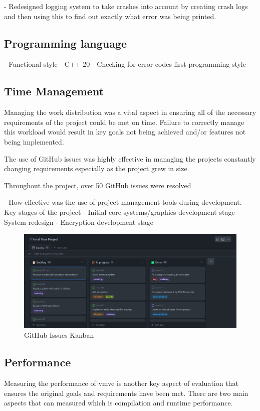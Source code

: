 \documentclass[11pt]{article}
\begin{document}
- Redesigned logging system to take crashes into account by creating crash logs
 and then using this to find out exactly what error was being printed.

\subsection{Programming language}
- Functional style
- C++ 20
- Checking for error codes first programming style

\subsection{Time Management}
Managing the work distribution was a vital aspect in ensuring all of the
necessary requirements of the project could be met on time. Failure to correctly 
manage this workload would result in key goals not being achieved and/or features
not being implemented.



The use of GitHub issues was highly effective in managing the projects
constantly changing requirements especially as the project grew in size.

Throughout the project, over 50 GitHub issues were resolved 

- How effective was the use of project management tools
during development.
- Key stages of the project
    - Initial core systems/graphics development stage
    - System redesign
    - Encryption development stage

\begin{figure}[h!]
  \centering
  \includegraphics[width=\textwidth]{images/github_project.png}
  \caption{GitHub Issues Kanban}
  \label{fig:github_kanban}
\end{figure}
    



\subsection{Performance}
Measuring the performance of \gls{vmve} is another key aspect of evaluation that
ensures the original goals and requirements have been met. There are two main aspects
that can measured which is compilation and runtime performance.
\end{document}
